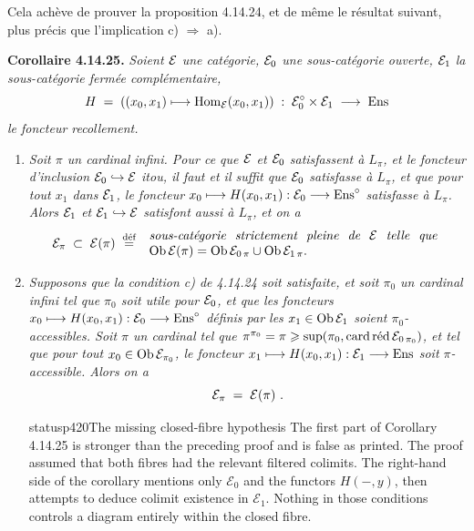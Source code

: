 Cela achève de prouver la proposition 4.14.24, et de même le résultat suivant, plus précis que l'implication c) $\Longrightarrow$ a).

\textbf{Corollaire 4.14.25.} \textit{Soient $\cE$ une catégorie, $\cE_0$ une sous-catégorie ouverte, $\cE_1$ la sous-catégorie fermée complémentaire,}
\[
H \;=\; ((x_0,x_1) \longmapsto \Hom_{\cE}(x_0,x_1)) \;:\; \cE_0^\circ \times \cE_1 \;\longrightarrow\; \Ens
\]
\textit{le foncteur recollement.}
\begin{enumerate}
\item[\textit{1°)}] \textit{Soit $\pi$ un cardinal infini. Pour ce que $\cE$ et $\cE_0$ satisfassent à $L_\pi$, et le foncteur d'inclusion $\cE_0 \hookrightarrow \cE$ itou, il faut et il suffit que $\cE_0$ satisfasse à $L_\pi$, et que pour tout $x_1$ dans $\cE_1$, le foncteur $x_0 \longmapsto H(x_0,x_1) : \cE_0 \longrightarrow \Ens^\circ$ satisfasse à $L_\pi$. Alors $\cE_1$ et $\cE_1 \hookrightarrow \cE$ satisfont aussi à $L_\pi$,}
\textit{et on a}
\[
\cE_\pi \;\subset\; \cE(\pi) \;\defeq\;
\begin{array}{l}
\text{\itshape sous-catégorie\ \ strictement\ \ pleine\ \ de\ \ $\cE$\ \ telle\ \ que}\\
\Ob\cE(\pi) = \Ob\cE_{0\,\pi} \cup \Ob\cE_{1\,\pi}.
\end{array}
\]
\item[\textit{2°)}] \textit{Supposons que la condition c) de 4.14.24 soit satisfaite, et soit $\pi_0$ un cardinal infini tel que $\pi_0$ soit utile pour $\cE_0$, et que les foncteurs $x_0 \longmapsto H(x_0,x_1) : \cE_0 \longrightarrow \Ens^\circ$ définis par les $x_1 \in \Ob\cE_1$ soient $\pi_0$-accessibles. Soit $\pi$ un cardinal tel que $\pi^{\pi_0} = \pi \geqslant \sup(\pi_0, \cardred\cE_{0\,\pi_0})$, et tel que pour tout $x_0 \in \Ob\cE_{\pi_0}$, le foncteur $x_1 \longmapsto H(x_0,x_1) : \cE_1 \longrightarrow \Ens$ soit $\pi$-accessible. Alors on a}
\[
\cE_\pi \;=\; \cE(\pi)\ .
\]

\begin{dcomment}{status}{p420}{The missing closed-fibre hypothesis}
The first part of Corollary 4.14.25 is stronger than the preceding proof and is false as printed. The proof assumed that both fibres had the relevant filtered colimits. The right-hand side of the corollary mentions only $\mathcal E_0$ and the functors $H(-,y)$, then attempts to deduce colimit existence in $\mathcal E_1$. Nothing in those conditions controls a diagram entirely within the closed fibre.


\end{dcomment}
\end{enumerate}
